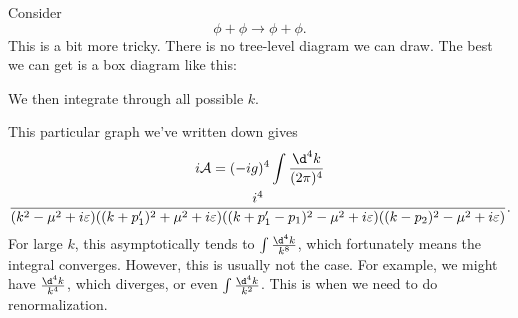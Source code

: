 \documentclass[a4paper]{article}
\begin{document}
\begin{eg}
  Consider
  \[
    \phi + \phi \to \phi + \phi.
  \]
  This is a bit more tricky. There is no tree-level diagram we can draw. The best we can get is a box diagram like this:
  \begin{center}
  \end{center}
  We then integrate through all possible $k$.

  This particular graph we've written down gives
  \begin{multline*}
    i\mathcal{A} = (-ig)^4 \int \frac{\d^4 k}{(2\pi)^4}\\\frac{i^4}{(k^2 - \mu^2 + i\varepsilon)((k + p_1')^2 + \mu^2 + i\varepsilon)((k + p_1' - p_1)^2 - \mu^2 + i \varepsilon)((k - p_2)^2 - \mu^2 + i \varepsilon)}.
  \end{multline*}
  For large $k$, this asymptotically tends to $\int \frac{\d^4 k}{k^8}$, which fortunately means the integral converges. However, this is usually not the case. For example, we might have $\frac{\d^4k}{k^4}$, which diverges, or even $\int \frac{\d^4 k}{k^2}$. This is when we need to do renormalization.
\end{eg}
\end{document}
